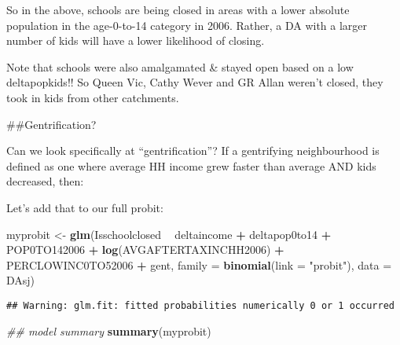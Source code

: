 \documentclass[]{article}
\newenvironment{Shaded}{\begin{snugshade}}{\end{snugshade}}
\newcommand{\CommentTok}[1]{\textcolor[rgb]{0.56,0.35,0.01}{\textit{#1}}}
\newcommand{\DataTypeTok}[1]{\textcolor[rgb]{0.13,0.29,0.53}{#1}}
\newcommand{\DecValTok}[1]{\textcolor[rgb]{0.00,0.00,0.81}{#1}}
\newcommand{\KeywordTok}[1]{\textcolor[rgb]{0.13,0.29,0.53}{\textbf{#1}}}
\newcommand{\NormalTok}[1]{#1}
\newcommand{\OperatorTok}[1]{\textcolor[rgb]{0.81,0.36,0.00}{\textbf{#1}}}
\newcommand{\StringTok}[1]{\textcolor[rgb]{0.31,0.60,0.02}{#1}}
\begin{document}
So in the above, schools are being closed in areas with a lower absolute
population in the age-0-to-14 category in 2006. Rather, a DA with a
larger number of kids will have a lower likelihood of closing.

Note that schools were also amalgamated \& stayed open based on a low
deltapopkids!! So Queen Vic, Cathy Wever and GR Allan weren't closed,
they took in kids from other catchments.

\#\#Gentrification?

Can we look specifically at ``gentrification''? If a gentrifying
neighbourhood is defined as one where average HH income grew faster than
average AND kids decreased, then:

\begin{Shaded}
\end{Shaded}

Let's add that to our full probit:

\begin{Shaded}
\begin{Highlighting}[]
\NormalTok{myprobit <-}\StringTok{ }\KeywordTok{glm}\NormalTok{(Isschoolclosed }\OperatorTok{~}\StringTok{ }\NormalTok{deltaincome }\OperatorTok{+}\StringTok{ }\NormalTok{deltapop0to14 }\OperatorTok{+}\StringTok{ }\NormalTok{POP0TO142006 }\OperatorTok{+}\StringTok{ }\KeywordTok{log}\NormalTok{(AVGAFTERTAXINCHH2006) }\OperatorTok{+}\StringTok{ }\NormalTok{PERCLOWINC0TO52006 }\OperatorTok{+}\StringTok{ }\NormalTok{gent, }\DataTypeTok{family =} \KeywordTok{binomial}\NormalTok{(}\DataTypeTok{link =} \StringTok{"probit"}\NormalTok{), }\DataTypeTok{data =}\NormalTok{ DAsj)}
\end{Highlighting}
\end{Shaded}

\begin{verbatim}
## Warning: glm.fit: fitted probabilities numerically 0 or 1 occurred
\end{verbatim}

\begin{Shaded}
\begin{Highlighting}[]
\CommentTok{## model summary}
\KeywordTok{summary}\NormalTok{(myprobit)}
\end{Highlighting}
\end{Shaded}
\end{document}
